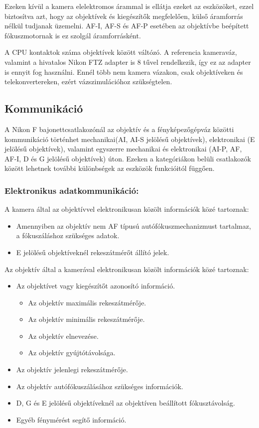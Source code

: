 Ezeken kívül a kamera elelektromos árammal is ellátja ezeket az eszközöket, ezzel biztosítva azt, hogy az objektívek és kiegészítők megfelelően, külső áramforrás nélkül tudjanak üzemelni.
AF-I, AF-S és AF-P esetében az objektívbe beépített fókuszmotornak is ez szolgál áramforrásként.

A CPU kontaktok száma objektívek között váltózó.\cite{Nikon_CPU}
A referencia kameraváz, valamint a hivatalos Nikon FTZ adapter is 8 tűvel rendelkezik, így ez az adapter is ennyit fog használni.
Ennél több nem kamera vázakon, csak objektíveken és telekonvertereken, ezért vázszimulációhoz szükségtelen.

\subsection{Kommunikáció}
A Nikon F bajonettcsatlakozónál az objektív és a fényképezőgépváz közötti kommunikáció történhet mechanikai(AI, AI-S jelölésű objektívek)\cite{Lens_naming}, elektronikai (E jelölésű objektívek)\cite{Lens_naming}, valamint egyszerre mechanikai és elektronikai (AI-P, AF, AF-I, D és G jelölésű objektívek)%
\cite{Nikon_CPU}úton. Ezeken a kategóriákon belüli csatlakozók között lehetnek további különbségek az eszközök funkcióitól függően.

\subsubsection{Elektronikus adatkommunikáció:}
A kamera által az objektívvel elektronikusan közölt információk közé tartoznak:
\begin{itemize}
    \item Amennyiben az objektív nem AF típusú autófókuszmechanizmust tartalmaz, a fókuszáláshoz szükséges adatok.
    \item E jelölésű objektíveknél rekeszátmérőt állító jelek.
\end{itemize}
Az objektív által a kamerával elektronikusan közölt információk közé tartoznak:
\begin{itemize}
    \item Az objektívet vagy kiegészítőt azonosító információ.
    \begin{itemize}
        \item Az objektív maximális rekeszátmérője.
        \item Az objektív minimális rekeszátmérője.
        \item Az objektív elnevezése.
        \item Az objektív gyújtótávolsága.%
    \end{itemize}
    \item Az objektív jelenlegi rekeszátmérője.
    \item Az objektív autófókuszálásához szükséges információk.
    \item D, G és E jelölésű objektíveknél az objektíven beállított fókusztávolság.
    \item Egyéb fénymérést segítő információ.
\end{itemize}

